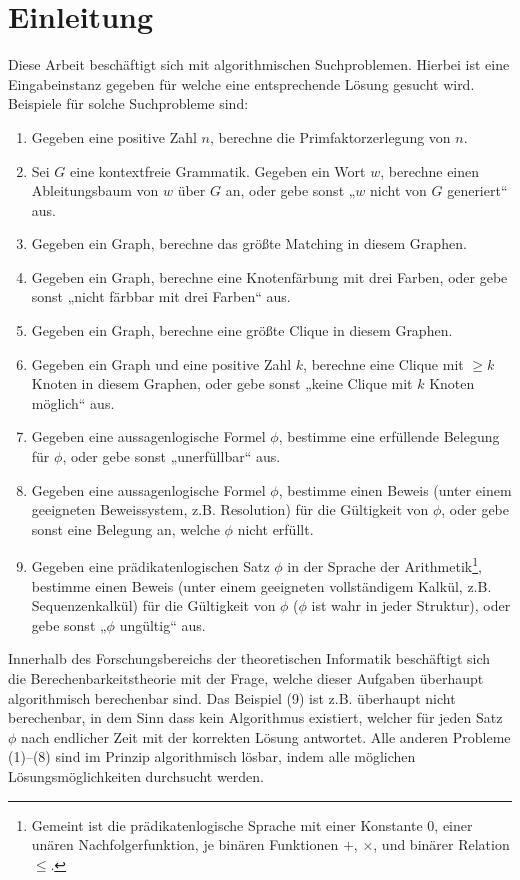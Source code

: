 \chapter{Einleitung}

Diese Arbeit beschäftigt sich mit algorithmischen Suchproblemen. 
Hierbei ist eine Eingabeinstanz gegeben für welche eine entsprechende Lösung gesucht wird.
Beispiele für solche Suchprobleme sind:
\begin{enumerate}[label=\arabic*.,beginpenalty=0,midpenalty=0]
    \item Gegeben eine positive Zahl $n$, berechne die Primfaktorzerlegung von $n$.
    \item Sei $G$ eine kontextfreie Grammatik. Gegeben ein Wort $w$, berechne einen Ableitungsbaum von $w$ über $G$ an, oder gebe sonst „$w$ nicht von $G$ generiert“ aus.
    \item Gegeben ein Graph, berechne das größte Matching in diesem Graphen.
    \item Gegeben ein Graph, berechne eine Knotenfärbung mit drei Farben, oder gebe sonst „nicht färbbar mit drei Farben“ aus.
    \item Gegeben ein Graph, berechne eine größte Clique in diesem Graphen.
    \item Gegeben ein Graph und eine positive Zahl $k$, berechne eine Clique mit $\geq k$ Knoten in diesem Graphen, oder gebe sonst „keine Clique mit $k$ Knoten möglich“ aus.
    \item Gegeben eine aussagenlogische Formel $\phi$, bestimme eine erfüllende Belegung für $\phi$, oder gebe sonst „unerfüllbar“ aus.
    \item Gegeben eine aussagenlogische Formel $\phi$, bestimme einen Beweis (unter einem geeigneten Beweissystem, z.B. Resolution) für die Gültigkeit von $\phi$, oder gebe sonst eine Belegung an, welche $\phi$ nicht erfüllt.
    \item Gegeben eine prädikatenlogischen Satz $\phi$ in der Sprache der Arithmetik\footnote{Gemeint ist die prädikatenlogische Sprache mit einer Konstante $0$, einer unären Nachfolgerfunktion, je binären Funktionen $+$, $\times$, und binärer Relation $\leq$.}, bestimme einen Beweis (unter einem geeigneten vollständigem Kalkül, z.B. Sequenzenkalkül) für die Gültigkeit von $\phi$ ($\phi$ ist wahr in jeder Struktur), oder gebe sonst „$\phi$ ungültig“ aus.
\end{enumerate}
Innerhalb des Forschungsbereichs der theoretischen Informatik beschäftigt sich die Berechenbarkeitstheorie mit der Frage, welche dieser Aufgaben überhaupt algorithmisch berechenbar sind. Das Beispiel (9) ist z.B. überhaupt nicht berechenbar, in dem Sinn dass kein Algorithmus existiert, welcher für jeden Satz $\phi$ nach endlicher Zeit mit der korrekten Lösung antwortet.
Alle anderen Probleme (1)–(8) sind im Prinzip algorithmisch lösbar, indem alle möglichen Lösungsmöglichkeiten durchsucht werden.

